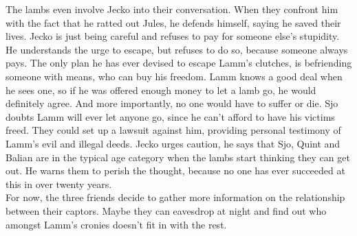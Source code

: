 The lambs even involve Jecko into their conversation. When they confront him with the fact that he ratted out Jules, he defends himself, saying he saved their lives. Jecko is just being careful and refuses to pay for someone else's stupidity. He understands the urge to escape, but refuses to do so, because someone always pays. The only plan he has ever devised to escape Lamm's clutches, is befriending someone with means, who can buy his freedom. Lamm knows a good deal when he sees one, so if he was offered enough money to let a lamb go, he would definitely agree. And more importantly, no one would have to suffer or die. Sjo doubts Lamm will ever let anyone go, since he can't afford to have his victims freed. They could set up a lawsuit against him, providing personal testimony of Lamm's evil and illegal deeds. Jecko urges caution, he says that Sjo, Quint and Balian are in the typical age category when the lambs start thinking they can get out. He warns them to perish the thought, because no one has ever succeeded at this in over twenty years.\\

For now, the three friends decide to gather more information on the relationship between their captors. Maybe they can eavesdrop at night and find out who amongst Lamm's cronies doesn't fit in with the rest.\\

